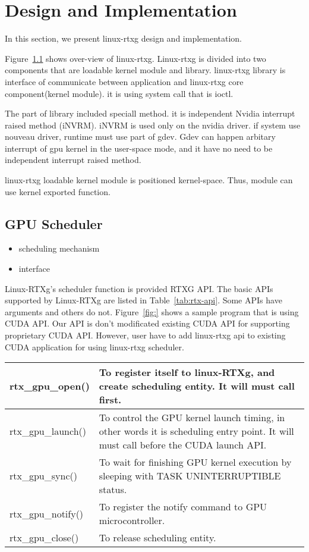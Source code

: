 \section{Design and Implementation}
In this section, we present linux-rtxg design and implementation.

Figure~\ref{} shows over-view of linux-rtxg.
Linux-rtxg is divided into two components that are loadable kernel module and library.
linux-rtxg library is interface of communicate between application and linux-rtxg core component(kernel module).
it is using system call that is ioctl.

The part of library included speciall method.
it is independent Nvidia interrupt raised method (iNVRM).
iNVRM is used only on the nvidia driver.
if system use nouveau driver, runtime must use part of gdev.
Gdev can happen arbitary interrupt of gpu kernel in the user-space mode, and it have no need to be independent interrupt raised method.

linux-rtxg loadable kernel module is positioned kernel-space.
Thus, module can use kernel exported function.

\subsection{GPU Scheduler}

\color{red}

\begin{itemize}
\item scheduling mechanism
\item interface
\end{itemize}
\color{black}

Linux-RTXg's scheduler function is provided RTXG API.
The basic APIs supported by Linux-RTXg are listed in Table~\ref{tab:rtx-api}.
Some APIs have arguments and others do not.
Figure~\ref{fig:} shows a sample program that is using CUDA API.
Our API is don't modificated existing CUDA API for supporting proprietary CUDA API.
However, user have to add linux-rtxg api to existing CUDA application for using linux-rtxg scheduler.

\begin{table*}[t]
\begin{center}
\caption{Basic Linux-RTXg APIs}
\label{tab:rtx-api}
\begin{tabular}{|l|p{50em}|} \hline
rtx\_gpu\_open() & To register itself to linux-RTXg, and create scheduling entity. It will must call first. \\ \hline
rtx\_gpu\_launch() & To control the GPU kernel launch timing, in other words it is scheduling entry point. It will must call before the CUDA launch API. \\ \hline
rtx\_gpu\_sync() & To wait for finishing GPU kernel execution by sleeping with TASK UNINTERRUPTIBLE status.\\ \hline
rtx\_gpu\_notify() & To register the notify command to GPU microcontroller.\\ \hline
rtx\_gpu\_close() & To release scheduling entity.\\ \hline
\end{tabular}
\end{center}
\end{table*}

